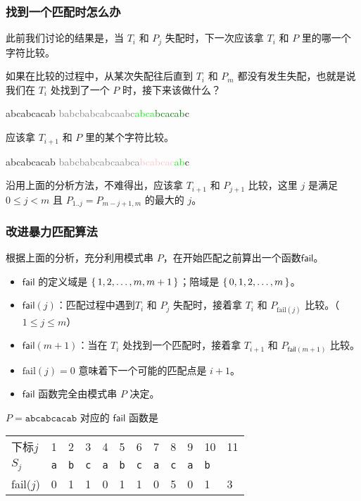 \documentclass{ctexbeamer}
\newcommand{\pink}[1]{\textcolor{pink}{#1}}
\newcommand{\green}[1]{\textcolor{green}{#1}}
\newcommand{\gray}[1]{\textcolor{gray}{#1}}
\newcommand{\lime}[1]{\textcolor{lime}{#1}}
\newcommand{\str}[1]{\texttt{#1}}
\newcommand{\fail}{\mathsf{fail}}
\begin{document}
\begin{frame}[fragile]
  \frametitle{找到一个匹配时怎么办}

  此前我们讨论的结果是，当 $T_i$ 和 $P_j$ 失配时，下一次应该拿 $T_i$ 和 $P$ 里的哪一个字符比较。
  
  如果在比较的过程中，从某次失配往后直到 $T_i$ 和 $P_m$ 都没有发生失配，也就是说我们在 $T_i$ 处找到了一个 $P$ 时，接下来该做什么？


  \begin{tverb}[frame=bottomline, fontsize=\small]
               abcabcacab
\gray{babcbabcabcaabc}\lime{abca}\green{bcacab}c
\end{tverb}

\begin{tcolorbox}
  应该拿 $T_{i+1}$ 和 $P$ 里的某个字符比较。
\end{tcolorbox}


\begin{tverb}[frame=bottomline, fontsize=\small]
                       abcabcacab
\gray{babcbabcabcaabca}\pink{bcabcac}\lime{ab}c
\end{tverb}


沿用上面的分析方法，不难得出，应该拿 $T_{i+1}$ 和 $P_{j+1}$ 比较，这里 $j$ 是满足 $0 \le j < m$ 且 $P_{1..j} = P_{m-j+1,m}$ 的最大的 $j$。

\end{frame}



\begin{frame}
\frametitle{改进暴力匹配算法}
根据上面的分析，充分利用模式串 $P$，在开始匹配之前算出一个函数$\fail$。

\begin{itemize}
\item $\fail$ 的定义域是 $\set{1, 2, \dots, m, m + 1}$；陪域是 $\set{0, 1, 2, \dots, m}$。
\item $\fail(j)$：匹配过程中遇到$T_i$ 和 $P_j$ 失配时，接着拿 $T_i$ 和 $P_{\text{fail}(j)}$ 比较。（$1 \le j \le m$）
\item $\fail(m+1)$：当在 $T_i$ 处找到一个匹配时，接着拿 $T_{i+1}$ 和 $P_{\fail(m+1)}$ 比较。
\item $\text{fail}(j) = 0$ 意味着下一个可能的匹配点是 $i+1$。
\item $\fail$ 函数完全由模式串 $P$ 决定。
\end{itemize}

$P=\str{abcabcacab}$ 对应的 $\fail$ 函数是

\begin{table}[]
\begin{tabular}{llllllllllll}
下标$j$ & 1  & 2  & 3 & 4 & 5 & 6 & 7 & 8 & 9 & 10 & 11\\
$S_j$ & \str{a} & \str{b} & \str{c} & \str{a} & \str{b} & \str{c} & \str{a} & \str{c} & \str{a}  & \str{b} \\
fail($j$) & 0  & 1  & 1 & 0 & 1 & 1 & 0 & 5  & 0  & 1 & 3
\end{tabular}
\end{table}

\end{frame}
\end{document}
